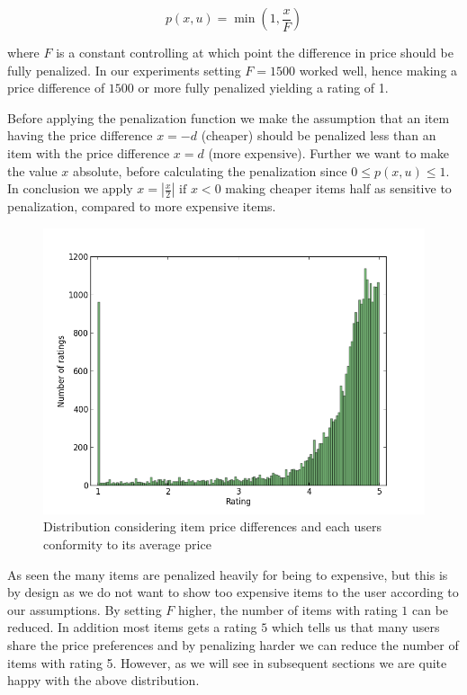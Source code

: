 \begin{equation}
  p(x,u) = \min({1, \frac{x}{F}})
\end{equation}

where $F$ is a constant controlling at which point the difference in price
should be fully penalized. In our experiments setting $F = 1500$ worked well,
hence making a price difference of $1500$ or more fully penalized yielding a
rating of 1.

Before applying the penalization function we make the assumption that an item
having the price difference $x = -d$ (cheaper) should be penalized less than an
item with the price difference $x = d$ (more expensive). Further we want to
make the value $x$ absolute, before calculating the penalization since $0 \leq
p(x,u) \leq 1$. In conclusion we apply $x = |\frac{x}{2}|$ $\text{if}$ $ x < 0$
making cheaper items half as sensitive to penalization, compared to more
expensive items.

\begin{figure}[H]
  \centering
  \includegraphics[scale=0.5]{image/dist-price}
  \caption{Distribution considering item price differences and each users conformity to
  its average price}
  \label{fig:dist-price}
\end{figure}

As seen the many items are penalized heavily for being to expensive, but this
is by design as we do not want to show too expensive items to the user
according to our assumptions. By setting $F$ higher, the number of items with
rating $1$ can be reduced. In addition most items gets a rating $5$ which tells
us that many users share the price preferences and by penalizing harder we can
reduce the number of items with rating 5. However, as we will see in subsequent
sections we are quite happy with the above distribution.

